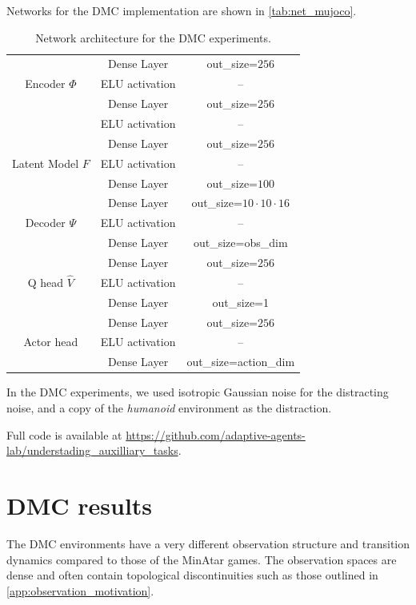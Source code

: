 Networks for the DMC implementation are shown in \autoref{tab:net_mujoco}.

\begin{table}
\begin{center}
\begin{tabular}{c|c|c}
     & Dense Layer & out\_size=$256$ \\
     Encoder $\Phi$ & ELU activation & -- \\
     & Dense Layer & out\_size=$256$\\
     & ELU activation & -- \\\hline
     & Dense Layer & out\_size=$256$ \\
     Latent Model $F$ & ELU activation & -- \\
     & Dense Layer & out\_size=$100$\\\hline
     & Dense Layer & out\_size=$10\cdot10\cdot16$\\
     Decoder $\Psi$ & ELU activation & -- \\
     & Dense Layer & out\_size=obs\_dim\\\hline
     & Dense Layer & out\_size=$256$ \\
     Q head $\hat{V}$ & ELU activation & --\\
     & Dense Layer & out\_size=1\\\hline
     & Dense Layer & out\_size=$256$ \\
     Actor head & ELU activation & --\\
     & Dense Layer & out\_size=action\_dim
\end{tabular}
\end{center}
\caption{Network architecture for the DMC experiments.}
\label{tab:net_mujoco}
\end{table}
In the DMC experiments, we used isotropic Gaussian noise for the distracting noise, and a copy of the \emph{humanoid} environment as the distraction.

Full code is available at \url{https://github.com/adaptive-agents-lab/understading_auxilliary_tasks}.


\section{DMC results}
\label{app:mujoco_results}

The DMC environments have a very different observation structure and transition dynamics compared to those of the MinAtar games. The observation spaces are dense and often contain topological discontinuities such as those outlined in \autoref{app:observation_motivation}.

